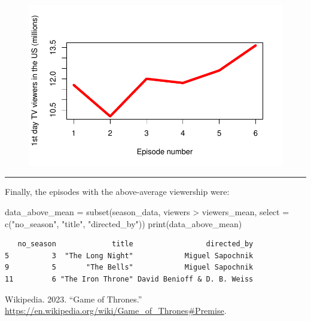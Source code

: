 \documentclass[
  letterpaper,
  DIV=11,
  numbers=noendperiod]{scrartcl}
\newenvironment{Shaded}{\begin{snugshade}}{\end{snugshade}}
\newcommand{\AttributeTok}[1]{\textcolor[rgb]{0.40,0.45,0.13}{#1}}
\newcommand{\FunctionTok}[1]{\textcolor[rgb]{0.28,0.35,0.67}{#1}}
\newcommand{\NormalTok}[1]{\textcolor[rgb]{0.00,0.23,0.31}{#1}}
\newcommand{\OtherTok}[1]{\textcolor[rgb]{0.00,0.23,0.31}{#1}}
\newcommand{\SpecialCharTok}[1]{\textcolor[rgb]{0.37,0.37,0.37}{#1}}
\newcommand{\StringTok}[1]{\textcolor[rgb]{0.13,0.47,0.30}{#1}}
\newlength{\cslhangindent}
\newlength{\cslentryspacingunit} %
\newenvironment{CSLReferences}[2] %
 {%
  \setlength{\parindent}{0pt}
  \ifodd #1
  \let\oldpar\par
  \def\par{\hangindent=\cslhangindent\oldpar}
  \fi
  \setlength{\parskip}{#2\cslentryspacingunit}
 }%
 {}
\begin{document}
\begin{figure}[H]

{\centering \includegraphics{Assignment_files/figure-pdf/viewers_plot-1.pdf}

}

\end{figure}

\begin{center}\rule{0.5\linewidth}{0.5pt}\end{center}

Finally, the episodes with the above-average viewership were:

\begin{Shaded}
\begin{Highlighting}[]
\NormalTok{data\_above\_mean }\OtherTok{=} \FunctionTok{subset}\NormalTok{(season\_data, viewers }\SpecialCharTok{\textgreater{}}\NormalTok{ viewers\_mean, }\AttributeTok{select =} \FunctionTok{c}\NormalTok{(}\StringTok{"no\_season"}\NormalTok{, }\StringTok{"title"}\NormalTok{, }\StringTok{"directed\_by"}\NormalTok{))}
\FunctionTok{print}\NormalTok{(data\_above\_mean)}
\end{Highlighting}
\end{Shaded}

\begin{verbatim}
   no_season             title                 directed_by
5          3  "The Long Night"            Miguel Sapochnik
9          5       "The Bells"            Miguel Sapochnik
11         6 "The Iron Throne" David Benioff & D. B. Weiss
\end{verbatim}

\hypertarget{refs}{}
\begin{CSLReferences}{1}{0}
\leavevmode{}%
Wikipedia. 2023. {``Game of Thrones.''}
\url{https://en.wikipedia.org/wiki/Game_of_Thrones\#Premise}.

\end{CSLReferences}
\end{document}

